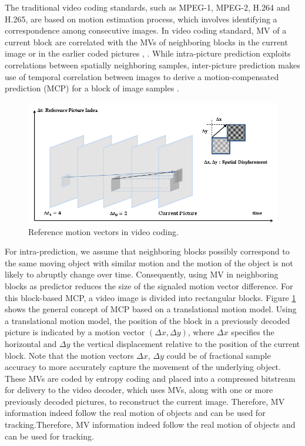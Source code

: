 The traditional video coding standards, such as MPEG-1, MPEG-2, H.264 and H.265, are based on motion estimation process, which involves identifying a correspondence among consecutive images. In video coding standard, MV of a current block are correlated with the MVs of neighboring blocks in the current image or in the earlier coded pictures \cite{laroche2008rd}, \cite{jiang2019spatial}. While intra-picture prediction exploits correlations between spatially neighboring samples, inter-picture prediction makes use of temporal correlation between images to derive a motion-compensated prediction (MCP) for a block of image samples \cite{bross2014inter}.
\begin{figure}
\centering
 \includegraphics[width=0.8\linewidth]{Figures/mv.png}
 \caption{ Reference motion vectors in video coding.}
 \label{fig:mv}
\end{figure}
For intra-prediction, we assume that neighboring blocks possibly correspond to the same moving object with similar motion and the motion of the object is not likely to abruptly change over time. Consequently, using MV in neighboring blocks as predictor reduces the size of the signaled motion vector difference. For this block-based MCP, a video image is divided into rectangular blocks. Figure \ref{fig:mv} shows the general concept of MCP based on a translational motion model. Using a translational motion model, the position of the block in a previously decoded picture is indicated by a motion vector $(\Delta x, \Delta y)$, where $\Delta x$ specifies the horizontal and $\Delta y$ the vertical displacement relative to the position of the current block. Note that the motion vectors $\Delta x$, $\Delta y$ could be of fractional sample accuracy to more accurately capture the movement of the underlying object. These MVs are coded by entropy coding and placed into a compressed bitstream for delivery to the video decoder, which uses MVs, along with one or more previously decoded pictures, to reconstruct the current image. Therefore, MV information indeed follow the real motion of objects and can be used for tracking.Therefore, MV information indeed follow the real motion of objects and can be used for tracking.\\

